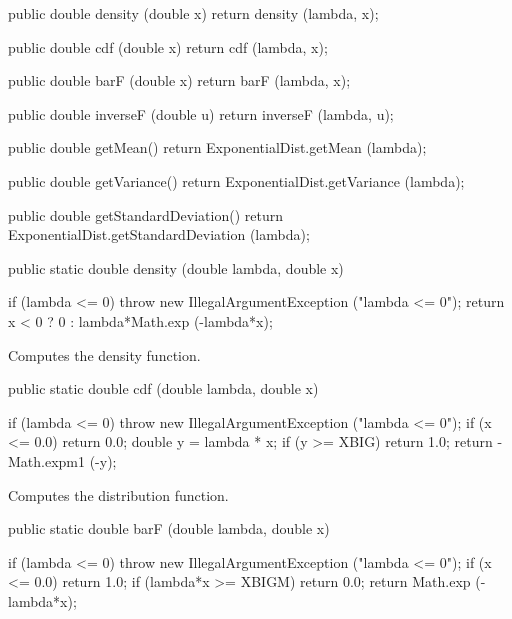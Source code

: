 \begin{code}\begin{hide}

   public double density (double x) {
      return density (lambda, x);
   }

   public double cdf (double x) {
      return cdf (lambda, x);
   }

   public double barF (double x) {
      return barF (lambda, x);
   }

   public double inverseF (double u) {
      return inverseF (lambda, u);
   }

   public double getMean() {
      return ExponentialDist.getMean (lambda);
   }

   public double getVariance() {
      return ExponentialDist.getVariance (lambda);
   }

   public double getStandardDeviation() {
      return ExponentialDist.getStandardDeviation (lambda);
   }\end{hide}

   public static double density (double lambda, double x)\begin{hide} {
      if (lambda <= 0)
         throw new IllegalArgumentException ("lambda <= 0");
      return x < 0 ? 0 : lambda*Math.exp (-lambda*x);
   }\end{hide}
\end{code}
\begin{tabb} Computes the density function.
\end{tabb}
\begin{code}

   public static double cdf (double lambda, double x)\begin{hide} {
      if (lambda <= 0)
         throw new IllegalArgumentException ("lambda <= 0");
      if (x <= 0.0)
         return 0.0;
      double y = lambda * x;
      if (y >= XBIG)
         return 1.0;
      return -Math.expm1 (-y);
   }\end{hide}
\end{code}
 \begin{tabb}
  Computes the  distribution function.
 \end{tabb}
\begin{code}

   public static double barF (double lambda, double x)\begin{hide} {
      if (lambda <= 0)
         throw new IllegalArgumentException ("lambda <= 0");
      if (x <= 0.0)
         return 1.0;
      if (lambda*x >= XBIGM)
         return 0.0;
         return Math.exp (-lambda*x);
   }\end{hide}
\end{code}
